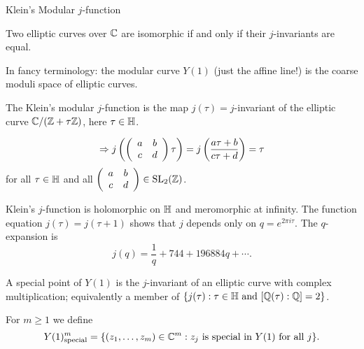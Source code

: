 \documentclass{beamer}
\begin{document}
\begin{frame}{Klein's Modular $j$-function}
  \begin{theorem}
    Two elliptic curves over ${\mathbb{C}}$ are
    isomorphic if and only if their $j$-invariants are equal.
  \end{theorem}

  In fancy terminology: the modular curve $Y(1)$ (just the
  affine line!)
  is the coarse moduli space of elliptic curves.

  \begin{definition}
    The Klein's modular $j$-function is the map $j(\tau) =
    j$-invariant of the elliptic curve ${\mathbb{C}}/({\mathbb{Z}}+\tau{\mathbb{Z}})$, here
    $\tau\in{\mathbb{H}}$. 
  \end{definition}
  
  \begin{equation*}
  \Rightarrow  j\left(\left( \begin{array}{cc} {a} & {b} \\ {c} & {d} \end{array} \right) \tau\right) = j\left(\frac{a\tau + b}{c\tau +d}\right) =
    \tau 
  \end{equation*}
  for all $\tau\in{\mathbb{H}}$ and all $\left( \begin{array}{cc} {a} & {b} \\ {c} & {d} \end{array} \right)\in
  \mathrm{SL}_2({\mathbb{Z}})$.
\end{frame}

\begin{frame}
  Klein's $j$-function is
  holomorphic on ${\mathbb{H}}$ and meromorphic at infinity.
  The function equation $j(\tau)=j(\tau+1)$ shows that $j$ depends only
  on $q=e^{2\pi i \tau}$. The $q$-expansion is
  \begin{equation*}
    j(q) = \frac 1q + 744 + 196884q +\cdots. 
  \end{equation*}
  \begin{definition}    
    A special point of $Y(1)$ is the $j$-invariant of an elliptic curve
    with complex multiplication; equivalently a member of 
    $\{j(\tau) : \tau\in{\mathbb{H}} \text{ and }[{\mathbb{Q}}(\tau):{\mathbb{Q}}]=2\}$.

    For $m\ge 1$ we define
    $$
    Y(1)^m_{\mathrm{special}} = \{(z_1,\ldots,z_m)\in{\mathbb{C}}^m : z_j \text{ is
      special in $Y(1)$ for all $j$}\}.
    $$
  \end{definition}
\end{frame}
\end{document}
